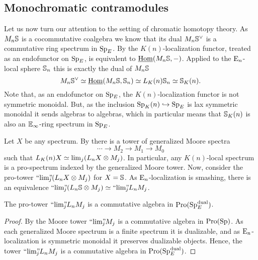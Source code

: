\subsection{Monochromatic contramodules}

Let us now turn our attention to the setting of chromatic homotopy theory. As $M_n\S$ is a cocommutative coalgebra we know that its dual $M_n\S^\vee$ is a commutative ring spectrum in $\SpE$. By \cite[2.21(4)]{barthel-heard-valenzuela_2018} the $K(n)$-localization functor, treated as an endofunctor on $\SpE$, is equivalent to $\iHom(M_n\S,-)$. Applied to the $\En$-local sphere $\S_n$ this is exactly the dual of $M_n\S$
\[M_n \S^\vee \simeq \iHom(M_n\S, \S_n)\simeq L_\Kn \S_n \simeq \S_\Kn.\]
Note that, as an endofunctor on $\SpE$, the $K(n)$-localization functor is not symmetric monoidal. But, as the inclusion $\Sp_\Kn\hookrightarrow \SpE$ is lax symmetric monoidal it sends algebras to algebras, which in particular means that $\S_\Kn$ is also an $\E_\infty$-ring spectrum in $\SpE$. 

Let $X$ be any spectrum. By \cite[7.10]{hovey-strickland_99} there is a tower of generalized Moore spectra 
\[\cdots \to M_2 \to M_1 \to M_0\]
such that $L_\Kn X \simeq \lim_j (L_n X \otimes M_j)$. In particular, any $K(n)$-local spectrum is a pro-spectrum indexed by the generalized Moore tower. Now, consider the pro-tower $\prolim (L_n X \otimes M_j)$ for $X=\S$. As $\En$-localization is smashing, there is an equivalence $\prolim (L_n \S \otimes M_j)\simeq \prolim L_n M_j$. 

\begin{lemma}
    \label{ch2:lm:Moore-tower-in-local-dualizable}
    The pro-tower $\prolim L_n M_j$ is a commutative algebra in $\Pro(\SpE\dual)$. 
\end{lemma}
\begin{proof}
    By \cite[6.3]{davis-lawson_2014} the Moore tower $\prolim M_j$ is a commutative algebra in $\Pro(\Sp)$. As each generalized Moore spectrum is a finite spectrum it is dualizable, and as $\En$-localization is symmetric monoidal it preserves dualizable objects. Hence, the tower $\prolim L_n M_j$ is a commutative algebra in $\Pro(\SpE\dual)$. 
\end{proof}

